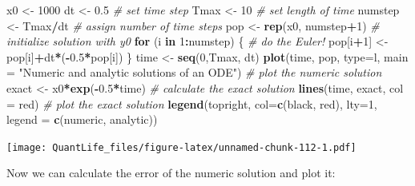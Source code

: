 \documentclass[
]{book}
\newenvironment{Shaded}{\begin{snugshade}}{\end{snugshade}}
\newcommand{\CommentTok}[1]{\textcolor[rgb]{0.56,0.35,0.01}{\textit{#1}}}
\newcommand{\ControlFlowTok}[1]{\textcolor[rgb]{0.13,0.29,0.53}{\textbf{#1}}}
\newcommand{\DataTypeTok}[1]{\textcolor[rgb]{0.13,0.29,0.53}{#1}}
\newcommand{\DecValTok}[1]{\textcolor[rgb]{0.00,0.00,0.81}{#1}}
\newcommand{\FloatTok}[1]{\textcolor[rgb]{0.00,0.00,0.81}{#1}}
\newcommand{\KeywordTok}[1]{\textcolor[rgb]{0.13,0.29,0.53}{\textbf{#1}}}
\newcommand{\NormalTok}[1]{#1}
\newcommand{\OperatorTok}[1]{\textcolor[rgb]{0.81,0.36,0.00}{\textbf{#1}}}
\newcommand{\StringTok}[1]{\textcolor[rgb]{0.31,0.60,0.02}{#1}}
\theoremstyle{definition}
\theoremstyle{definition}
\theoremstyle{definition}
\theoremstyle{remark}
\begin{document}
\begin{Shaded}
\begin{Highlighting}[]
\NormalTok{x0 \textless{}{-}}\StringTok{ }\DecValTok{1000}
\NormalTok{dt \textless{}{-}}\StringTok{ }\FloatTok{0.5} \CommentTok{\# set time step}
\NormalTok{Tmax \textless{}{-}}\StringTok{ }\DecValTok{10} \CommentTok{\# set length of time}
\NormalTok{numstep \textless{}{-}}\StringTok{ }\NormalTok{Tmax}\OperatorTok{/}\NormalTok{dt }\CommentTok{\# assign number of time steps}
\NormalTok{pop \textless{}{-}}\StringTok{ }\KeywordTok{rep}\NormalTok{(x0, numstep}\OperatorTok{+}\DecValTok{1}\NormalTok{) }\CommentTok{\# initialize solution with y0}
\ControlFlowTok{for}\NormalTok{ (i }\ControlFlowTok{in} \DecValTok{1}\OperatorTok{:}\NormalTok{numstep) \{ }\CommentTok{\# do the Euler!}
\NormalTok{    pop[i}\OperatorTok{+}\DecValTok{1}\NormalTok{] \textless{}{-}}\StringTok{ }\NormalTok{pop[i]}\OperatorTok{+}\NormalTok{dt}\OperatorTok{*}\NormalTok{(}\OperatorTok{{-}}\FloatTok{0.5}\OperatorTok{*}\NormalTok{pop[i])}
\NormalTok{\}}
\NormalTok{time \textless{}{-}}\StringTok{ }\KeywordTok{seq}\NormalTok{(}\DecValTok{0}\NormalTok{,Tmax, dt)}
\KeywordTok{plot}\NormalTok{(time, pop, }\DataTypeTok{type=}\StringTok{\textquotesingle{}l\textquotesingle{}}\NormalTok{, }\DataTypeTok{main =} \StringTok{"Numeric and analytic solutions of an ODE"}\NormalTok{) }\CommentTok{\# plot the numeric solution}
\NormalTok{exact \textless{}{-}}\StringTok{ }\NormalTok{x0}\OperatorTok{*}\KeywordTok{exp}\NormalTok{(}\OperatorTok{{-}}\FloatTok{0.5}\OperatorTok{*}\NormalTok{time) }\CommentTok{\# calculate the exact solution}
\KeywordTok{lines}\NormalTok{(time, exact, }\DataTypeTok{col =} \StringTok{\textquotesingle{}red\textquotesingle{}}\NormalTok{) }\CommentTok{\# plot the exact solution}
\KeywordTok{legend}\NormalTok{(}\StringTok{\textquotesingle{}topright\textquotesingle{}}\NormalTok{, }\DataTypeTok{col=}\KeywordTok{c}\NormalTok{(}\StringTok{\textquotesingle{}black\textquotesingle{}}\NormalTok{, }\StringTok{\textquotesingle{}red\textquotesingle{}}\NormalTok{), }\DataTypeTok{lty=}\DecValTok{1}\NormalTok{, }\DataTypeTok{legend =} \KeywordTok{c}\NormalTok{(}\StringTok{\textquotesingle{}numeric\textquotesingle{}}\NormalTok{, }\StringTok{\textquotesingle{}analytic\textquotesingle{}}\NormalTok{))}
\end{Highlighting}
\end{Shaded}

\texttt{[image: QuantLife\_files/figure-latex/unnamed-chunk-112-1.pdf]}

Now we can calculate the error of the numeric solution and plot it:
\end{document}
